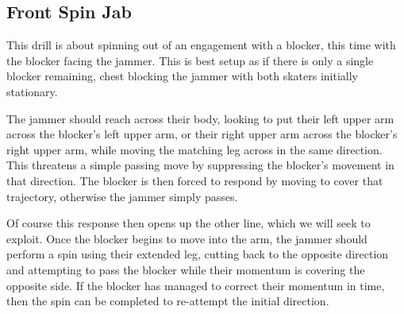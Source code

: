 \subsection*{Front Spin Jab}
\label{drill:last_blocker/front_spin_jab}

This drill is about spinning out of an engagement with a blocker, this time with the blocker facing the jammer.
This is best setup as if there is only a single blocker remaining, chest blocking the jammer with both skaters initially stationary.  
 
The jammer should reach across their body, looking to put their left upper arm across the blocker's left upper arm, or their right upper arm across the blocker's right upper arm, while moving the matching leg across in the same direction.   
This threatens a simple passing move by suppressing the blocker's movement in that direction. 
The blocker is then forced to respond by moving to cover that trajectory, otherwise the jammer simply passes. 


Of course this response then opens up the other line, which we will seek to exploit.
Once the blocker begins to move into the arm, the jammer should perform a spin using their extended leg, cutting back to the opposite direction and attempting to pass the blocker while their momentum is covering the opposite side.
If the blocker has managed to correct their momentum in time, then the spin can be completed to re-attempt the initial direction.



